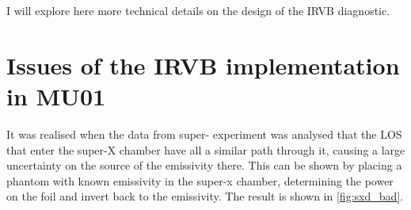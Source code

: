 

I will explore here more technical details on the design of the IRVB diagnostic.

\section{Issues of the IRVB implementation in MU01}\label{Issues of the IRVB implementation in MU01}

It was realised when the data from super- experiment was analysed that the LOS that enter the super-X chamber have all a similar path through it, causing a large uncertainty on the source of the emissivity there. This can be shown by placing a phantom with known emissivity in the super-x chamber, determining the power on the foil and invert back to the emissivity. The result is shown in \autoref{fig:sxd_bad}.

